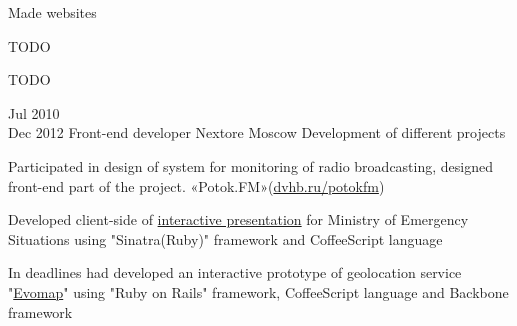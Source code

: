 \documentclass[11pt,a4paper,sans]{moderncv}
\newcommand{\lang}[2]{#2}
\begin{document}
\cvlistitem
    {\lang
        {Делал сайты для телеканалов СТС, ДТВ и Домашний, проекта «It's My Wine»(\href{http://itsmywine.ru}{itsmywine.ru}), интернет-магазина «Евродом», фотоаппаратов «Leica Camera», «Связного-клуба», сети поликлиник «Семейный Доктор», клуба «Пропаганда», кафе «Filial»(\href{http://filialmoscow.com/ru/}{filialmoscow.com}), торгово-офисного центра «Гименей»(\href{http://himeney.ru}{himeney.ru}) и многих других менее известных клиентов.}
        {Made websites}}

\cvlistitem
    {\lang
        {Занимался интеграцией с платёжными системами Assist и Payonline, системами бронирования авиабилетов Sabre и Sirena, системами бронирования отелей Hotelbook и Академсервис.}
        {TODO}}

\cvlistitem
    {\lang
        {Разработал приложение \href{https://github.com/ChillyBwoy/django-plugshop}{django-plugshop}, на основе которого в дальнейшем было создано несколько интернет-магазинов, например deathstar.ru и \href{http://powerball.ru}{powerball.ru}}
        {TODO}}


\cventry
    {\lang{Июл}{Jul} 2010\\\lang{Дек}{Dec} 2012}
    {\lang
        {Фронтенд разработчик}
        {Front-end developer}}
    {Nextore}
    {\lang
        {Москва}
        {Moscow}}
    {}
    {\lang
        {Разработка проектов компании}
        {Development of different projects}}

\cvlistitem
    {\lang
        {Принимал участие в проектировании системы мониторинга радиоэфира «Поток.FM»(\href{https://dvhb.ru/potokfm}{dvhb.ru/potokfm}), занимался разработкой клиентской части сервиса. Использованные технологии: JavaScript(Prototype.js), Ruby(Sinatra), CSS.}
        {Participated in design of system for monitoring of radio broadcasting, designed front-end part of the project. «Potok.FM»(\href{https://dvhb.ru/en/potokfm}{dvhb.ru/potokfm})}}

\cvlistitem
    {\lang
        {Разработал клиентскую часть интерактивной презентации для \href{http://nextore.ru/projects/3}{МЧС России}. Использованные технологии: Ruby(Sinatra), HAML, SCSS(Compass), CoffeeScript}
        {Developed client-side of \href{http://nextore.ru/projects/3}{interactive presentation} for Ministry of Emergency Situations using "Sinatra(Ruby)" framework and CoffeeScript language}}

\cvlistitem
    {\lang
        {В сжатые сроки реализовал прототип сервиса «\href{https://dvhb.ru/evomap}{Эвомап}» с использованием Ruby on Rails, CoffeeScript, Backbone и SCSS}
        {In deadlines had developed an interactive prototype of geolocation service "\href{https://dvhb.ru/evomap}{Evomap}" using "Ruby on Rails" framework, CoffeeScript language and Backbone framework}}
\end{document}
